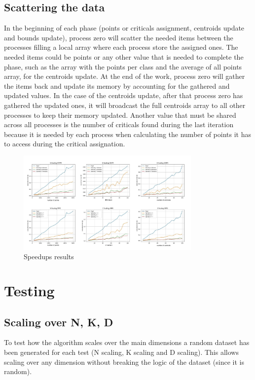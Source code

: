 \documentclass[conference]{IEEEtran}
\begin{document}
\subsection{Scattering the data}
In the beginning of each phase (points or criticals assignment, centroids update and bounds update), process zero will scatter the needed items between the processes filling a local array where each process store the assigned ones. The needed items could be points or any other value that is needed to complete the phase, such as the array with the points per class and the average of all points array, for the centroids update. At the end of the work, process zero will gather the items back and update its memory by accounting for the gathered and updated values. In the case of the centroids update, after that process zero has gathered the updated ones, it will broadcast the full centroids array to all other processes to keep their memory updated. Another value that must be shared across all processes is the number of criticals found during the last iteration because it is needed by each process when calculating the number of points it has to access during the critical assignation.

\begin{figure}
    \centering
    \caption{Speedups results}
    \label{fig:test_res}
    \includegraphics[width = 0.8\textwidth]{imgs/times.jpg}
\end{figure}
\section{Testing}
\subsection{Scaling over N, K, D}
To test how the algorithm scales over the main dimensions a random dataset has been generated for each test (N scaling, K scaling and D scaling). This allows scaling over any dimension without breaking the logic of the dataset (since it is random). 
\end{document}
